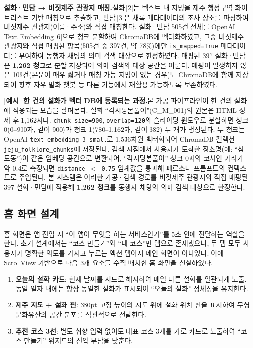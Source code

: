 \documentclass[10pt,twocolumn,a4paper]{article}
\begin{document}
\textbf{설화·민담 → 비짓제주 관광지 매핑.}\quad 설화\,[2]는 텍스트 내 지명을 제주
행정구역 화이트리스트 기반 매칭으로 추출하고, 민담\,[3]은 채록 메타데이터의 조사
장소를 파싱하여 비짓제주 관광지(이름·주소)와 직접 매칭한다.
설화·민담 505건 전체를 OpenAI Text Embedding\,[6]으로 청크 분할하여 ChromaDB에
벡터화하였고, 그중 비짓제주 관광지와 직접 매핑된 항목(505건 중 397건,
약 78\%)에만 \texttt{is\_mapped=True} 메타데이터를 부여하여 동행자 채팅의 의미
검색 대상으로 한정하였다. 매핑된 397 설화·민담은 \textbf{1{,}262 청크}로 분할
저장되어 의미 검색의 대상 공간을 이룬다. 매핑이 발생하지 않은 108건(본문이 매우
짧거나 매칭 가능 지명이 없는 경우)도 ChromaDB에 함께 저장되어 향후 자유 발화
챗봇 등 다른 기능에서 재활용 가능하도록 보존하였다.

\textbf{[예시] 한 건의 설화가 벡터 DB에 등록되는 과정.}\quad 본 가공 파이프라인이
한 건의 설화에 적용되는 모습을 살펴본다. 설화 ``각시당본풀이''(C\_M\_001)의
원본은 HTML 정제 후 1{,}162자다. \texttt{chunk\_size=900}, \texttt{overlap=120}의
슬라이딩 윈도우로 분할하면 청크 0(0--900자, 길이 900)과 청크 1(780--1{,}162자,
길이 382) 두 개가 생성된다. 두 청크는 OpenAI \texttt{text-embedding-3-small}로
1{,}536차원 벡터화되어 ChromaDB 컬렉션 \texttt{jeju\_folklore\_chunks}에 저장된다.
검색 시점에서 사용자가 도착한 장소명(예: ``삼도동'')이 같은 임베딩 공간으로
변환되어, ``각시당본풀이'' 청크 0과의 코사인 거리가 약 0.4로 측정되면
\texttt{distance $<$ 0.75} 임계값을 통과해 페르소나 프롬프트의 컨텍스트로
주입된다. 본 시스템은 이러한 가공·검색 경로를 비짓제주 관광지와 직접 매핑된
397 설화·민담에 적용해 \textbf{1{,}262 청크}를 동행자 채팅의 의미 검색 대상으로
한정한다.

\subsection{홈 화면 설계}

홈 화면은 앱 진입 시 ``이 앱이 무엇을 하는 서비스인가''를 5초 안에 전달하는
역할을 한다. 초기 설계에서는 ``코스 만들기''와 ``내 코스''만 탭으로 존재했으나,
두 탭 모두 사용자가 명확한 의도를 가지고 누르는 액션 탭이지 메인 화면이
아니었다. 이에 ScrollView 기반으로 다음 3개 요소를 수직 배치한 홈 화면을
신설하였다.

\begin{enumerate}
\setlength{\itemsep}{0pt}
\item \textbf{오늘의 설화 카드}: 현재 날짜를 시드로 해시하여 매일 다른 설화를
일관되게 노출. 동일 일자 내에는 항상 동일한 설화가 표시되어 ``오늘의 설화''
정체성을 유지한다.
\item \textbf{제주 지도 + 설화 핀}: 380pt 고정 높이의 지도 위에 설화
위치 핀을 표시하여 무형 문화유산의 공간 분포를 직관적으로 전달한다.
\item \textbf{추천 코스 3선}: 별도 취향 입력 없이도 대표 코스 3개를
가로 카드로 노출하여 ``코스 만들기'' 위저드의 진입 부담을 낮춘다.
\end{enumerate}
\end{document}
